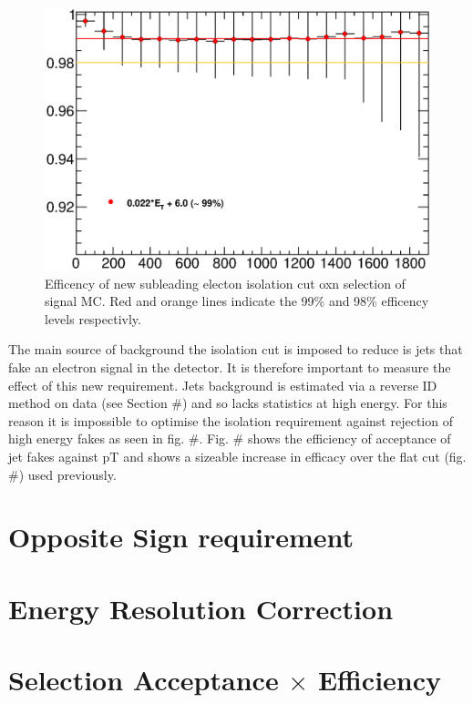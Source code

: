    \begin{figure}[h]
      \begin{center}
      \includegraphics[scale=0.6]{images/C5_sub_iso_efficiency.eps}
      \end{center}
   \caption{Efficency of new subleading electon isolation cut oxn selection of signal MC. Red and orange lines indicate the 99\% and 98\% efficency levels respectivly.}
   \label{fig:C5_sub_iso_efficiency}
   \end{figure}

The main source of background the isolation cut is imposed to reduce is jets that fake an electron signal in the detector. It is therefore important to measure the effect of this new requirement. Jets background is estimated via a reverse ID method on data (see Section \#) and so lacks statistics at high energy. For this reason it is impossible to optimise the isolation requirement against rejection of high energy fakes as seen in fig. \#. Fig. \# shows the efficiency of acceptance of jet fakes against pT and shows a sizeable increase in efficacy over the flat cut (fig. \#) used previously. 



\section{Opposite Sign requirement}



\section{Energy Resolution Correction}


\section{Selection Acceptance $\times$ Efficiency}




\newpage

